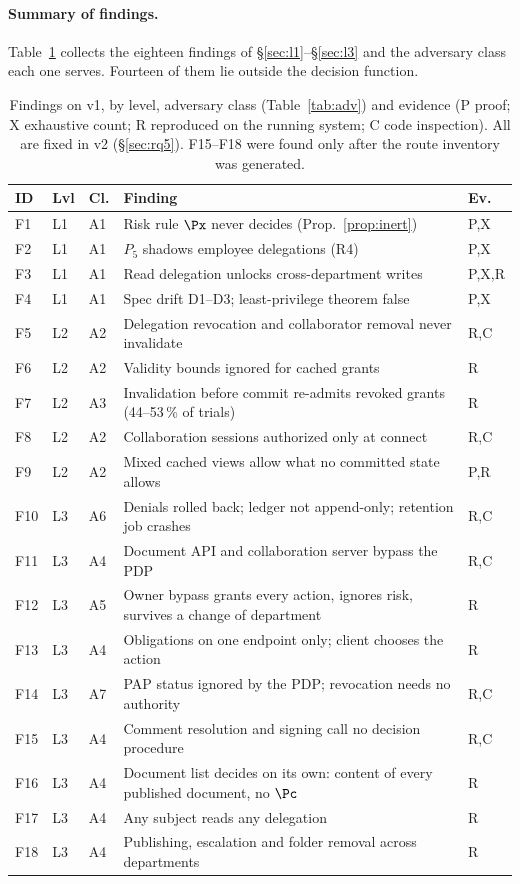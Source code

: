 \paragraph{Summary of findings.} Table~\ref{tab:findings} collects the eighteen findings of
\S\ref{sec:l1}--\S\ref{sec:l3} and the adversary class each one serves. Fourteen of them lie outside the decision
function.

\begin{table}[t]
\caption{Findings on \sysname v1, by level, adversary class (Table~\ref{tab:adv}) and evidence (P proof; X
exhaustive count; R reproduced on the running system; C code inspection). All are fixed in v2
(\S\ref{sec:rq5}). F15--F18 were found only after the route inventory was generated.}
\label{tab:findings}
\small
\begin{tabularx}{\columnwidth}{@{}l@{\;}l@{\;}l@{\;}X@{\;}l@{}}
\toprule
ID & Lvl & Cl. & Finding & Ev. \\
\midrule
F1 & L1 & A1 & Risk rule $\Px$ never decides (Prop.~\ref{prop:inert}) & P,X \\
F2 & L1 & A1 & $P_5$ shadows employee delegations (R4) & P,X \\
F3 & L1 & A1 & Read delegation unlocks cross-department writes & P,X,R \\
F4 & L1 & A1 & Spec drift D1--D3; least-privilege theorem false & P,X \\
F5 & L2 & A2 & Delegation revocation and collaborator removal never invalidate & R,C \\
F6 & L2 & A2 & Validity bounds ignored for cached grants & R \\
F7 & L2 & A3 & Invalidation before commit re-admits revoked grants (44--53\,\% of trials) & R \\
F8 & L2 & A2 & Collaboration sessions authorized only at connect & R,C \\
F9 & L2 & A2 & Mixed cached views allow what no committed state allows & P,R \\
F10 & L3 & A6 & Denials rolled back; ledger not append-only; retention job crashes & R,C \\
F11 & L3 & A4 & Document API and collaboration server bypass the PDP & R,C \\
F12 & L3 & A5 & Owner bypass grants every action, ignores risk, survives a change of department & R \\
F13 & L3 & A4 & Obligations on one endpoint only; client chooses the action & R \\
F14 & L3 & A7 & PAP status ignored by the PDP; revocation needs no authority & R,C \\
F15 & L3 & A4 & Comment resolution and signing call no decision procedure & R,C \\
F16 & L3 & A4 & Document list decides on its own: content of every published document, no $\Pc$ & R \\
F17 & L3 & A4 & Any subject reads any delegation & R \\
F18 & L3 & A4 & Publishing, escalation and folder removal across departments & R \\
\bottomrule
\end{tabularx}
\end{table}

